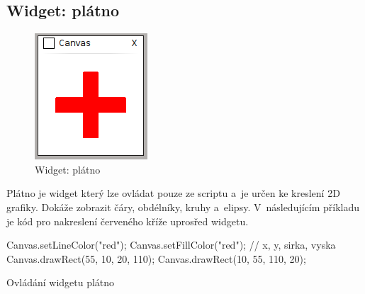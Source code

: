 \documentclass[12pt, a4paper, oneside]{article}
\begin{document}
\subsection{Widget: plátno}
\begin{figure}[H]
\begin{center}
\includegraphics[scale=1]{img/w_canvas.png}
\caption{Widget: plátno}
\end{center}
\end{figure}
Plátno je widget který lze ovládat pouze ze scriptu a~je určen ke kreslení 2D grafiky. Dokáže zobrazit čáry, obdélníky, kruhy a~elipsy. V~následujícím příkladu je kód pro nakreslení červeného kříže uprosřed widgetu.

\begin{listing}[H]
\begin{jscode}
Canvas.setLineColor("red");
Canvas.setFillColor("red");
// x, y, sirka, vyska
Canvas.drawRect(55, 10, 20, 110);
Canvas.drawRect(10, 55, 110, 20);
\end{jscode}
\caption{Ovládání widgetu plátno}
\end{listing}
\end{document}
